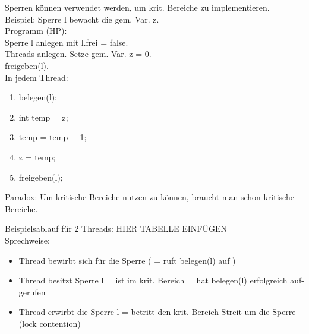Sperren können verwendet werden, um krit. Bereiche zu implementieren.\\
Beispiel: Sperre l bewacht die gem. Var. z.\\
Programm (HP):\\
Sperre l anlegen mit l.frei = false.\\
Threads anlegen. Setze gem. Var. z = 0.\\
freigeben(l).\\

In jedem Thread:\\
\begin{enumerate}
\setcounter{enumi}{0}
\item belegen(l);
\item int temp = z;
\item temp = temp + 1;
\item z = temp;
\item freigeben(l);
\end{enumerate}

Paradox: Um kritische Bereiche nutzen zu können, braucht man schon kritische Bereiche.

Beispielsablauf für 2 Threads:
HIER TABELLE EINFÜGEN
\\
Sprechweise:
\begin{itemize}
\item Thread bewirbt sich für die Sperre ( = ruft belegen(l) auf )
\item Thread besitzt Sperre l = ist im krit. Bereich = hat belegen(l) erfolgreich auf- gerufen
\item Thread erwirbt die Sperre l = betritt den krit. Bereich Streit um die Sperre (lock contention)
\end{itemize}